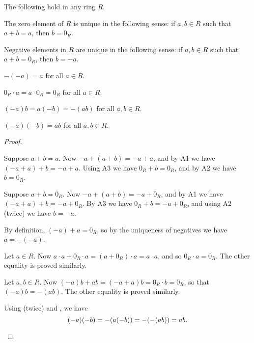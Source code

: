 \begin{prop} \label{prop:ring-basics}
The following hold in any ring \(R\).
\begin{proplist}
\item \label{prop:ring-basics:zero-unique} The zero element of \(R\) is unique in the following sense: if \(a,b \in R\) such that \(a+b = a\), then \(b = 0_R\).
\item \label{prop:ring-basics:negative-unique} Negative elements in \(R\) are unique in the following sense: if \(a,b \in R\) such that \(a+b = 0_R\), then \(b = -a\).
\item \label{prop:ring-basics:neg-neg} \(-(-a) = a\) for all \(a \in R\).
\item \label{prop:ring-basics:zero-times} \(0_R \cdot a = a \cdot 0_R = 0_R\) for all \(a \in R\).
\item \label{prop:ring-basics:move-neg} \((-a)b = a(-b) = -(ab)\) for all \(a,b \in R\).
\item \label{prop:ring-basics:neg-times-neg} \((-a)(-b) = ab\) for all \(a,b \in R\).
\end{proplist}
\end{prop}

\begin{proof}
\begin{inlineproplist}
\item Suppose \(a+b = a\).
Now \(-a + (a+b) = -a + a\), and by A1 we have \((-a + a) + b = -a + a\).
Using A3 we have \(0_R + b = 0_R\), and by A2 we have \(b = 0_R\).
\item Suppose \(a + b = 0_R\).
Now \(-a + (a+b) = -a + 0_R\), and by A1 we have \((-a+a)+b = -a+0_R\).
By A3 we have \(0_R + b = -a + 0_R\), and using A2 (twice) we have \(b = -a\).
\item By definition, \((-a) + a = 0_R\), so by the uniqueness of negatives we have \(a = -(-a)\).
\item Let \(a \in R\).
Now \(a \cdot a + 0_R \cdot a = (a + 0_R) \cdot a = a \cdot a\), and so \(0_R \cdot a = 0_R\).
The other equality is proved similarly.
\item Let \(a,b \in R\).
Now \((-a)b + ab = (-a + a)b = 0_R \cdot b = 0_R\), so that \((-a)b = -(ab)\).
The other equality is proved similarly.
\item Using  (twice) and , we have \[ (-a)(-b) = -(a(-b)) = -(-(ab)) = ab. \qedhere \]
\end{inlineproplist}
\end{proof}

